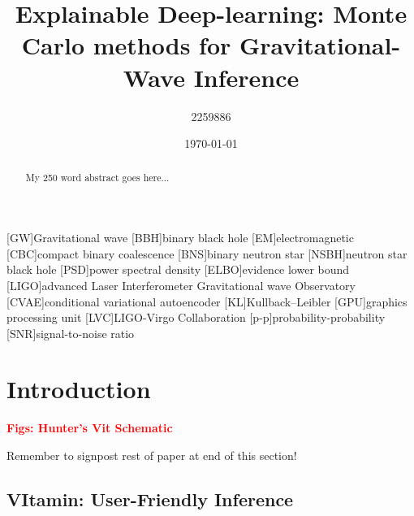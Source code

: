 \documentclass[aps,superscriptaddress,twocolumn,nopreprintnumbers,floatfix,groupedaddress]{revtex4-1}
\newcommand{\vitamin}{{\sc VItamin}\xspace}
\begin{document}
\title{Explainable Deep-learning: Monte Carlo methods for Gravitational-Wave Inference}

\author{2259886}
%

\date{\today}

\begin{abstract}
My 250 word abstract goes here...
\end{abstract}

\maketitle

[GW]{Gravitational wave}
[BBH]{binary black hole}
[EM]{electromagnetic}
[CBC]{compact binary coalescence}
[BNS]{binary neutron star}
[NSBH]{neutron star black hole}
[PSD]{power spectral density}
[ELBO]{evidence lower bound}
[LIGO]{advanced Laser Interferometer Gravitational wave Observatory}
[CVAE]{conditional variational autoencoder}
[KL]{Kullback--Leibler}
[GPU]{graphics processing unit}
[LVC]{LIGO-Virgo Collaboration}
[p-p]{probability-probability}
[SNR]{signal-to-noise ratio}

\section{Introduction}\label{intro}

\textbf{\textcolor{red}{Figs: Hunter's Vit Schematic}}



Remember to signpost rest of paper at end of this section!

%
\subsection{\vitamin: User-Friendly Inference}\label{vit}
\end{document}
